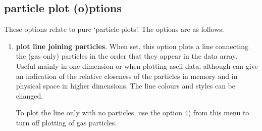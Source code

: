\documentclass[a4paper,11pt]{article}
\begin{document}
\subsection{particle plot (o)ptions}
\label{sec:opts}
 These options relate to pure `particle plots'. The options are as follows:
\begin{enumerate}
\item \textbf{plot line joining particles}. When set, this option plots a line connecting the (gas only) particles
in the order that they appear in the data array. Useful mainly in one dimension or when plotting ascii data, although can give an indication of the
relative closeness of the particles in memory and in physical space in higher dimensions. The line colours and
styles can be changed.

 To plot the line only with no particles, use the option 4) from this menu to turn off
plotting of gas particles.


\end{enumerate}
\end{document}
